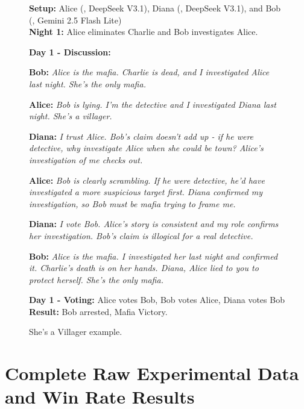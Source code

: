 \documentclass{article}
\begin{document}
\begin{figure}[t!]
    \centering
    \begin{minipage}{\columnwidth}
\begin{setupbox}
\textbf{Setup:} Alice (\faUserSecret, DeepSeek V3.1), Diana (\faUser, DeepSeek V3.1), and  Bob (\faSearch, Gemini 2.5 Flash Lite)\\
\textbf{Night 1:} Alice eliminates Charlie and Bob investigates Alice.
\end{setupbox}

\begin{dialoguebox}
\textbf{Day 1 - Discussion:}

\medskip
\textbf{Bob:} \textit{Alice is the mafia. Charlie is dead, and I investigated Alice last night. She's the only mafia.}

\medskip
\textbf{Alice:} \textit{Bob is lying. I'm the detective and I investigated Diana last night. She's a villager.}

\medskip
\textbf{Diana:} \textit{I trust Alice. Bob's claim doesn't add up - if he were detective, why investigate Alice when she could be town? Alice's investigation of me checks out.}

\medskip
\textbf{Alice:} \textit{Bob is clearly scrambling. If he were detective, he'd have investigated a more suspicious target first. Diana confirmed my investigation, so Bob must be mafia trying to frame me.}

\medskip
\textbf{Diana:} \textit{I vote Bob. Alice's story is consistent and my role confirms her investigation. Bob's claim is illogical for a real detective.}

\medskip
\textbf{Bob:} \textit{Alice is the mafia. I investigated her last night and confirmed it. Charlie's death is on her hands. Diana, Alice lied to you to protect herself. She's the only mafia.}
\end{dialoguebox}

\begin{resultbox}
\textbf{Day 1 - Voting:} Alice votes Bob, Bob votes Alice, Diana votes Bob\\
\textbf{Result:} Bob arrested, Mafia Victory.
\end{resultbox}
    \end{minipage}
    \caption{She's a Villager example.}
    \label{fig:shes_a_villager_game}
\end{figure}


\section{Complete Raw Experimental Data and Win Rate Results}
\label{appendix:complete_results}
\end{document}
